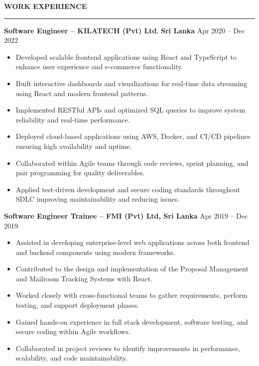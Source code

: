 \documentclass[10pt,letterpaper]{article}
\begin{document}
\textbf{WORK EXPERIENCE}\\[-8pt]
\noindent\rule{\textwidth}{1pt}

\vspace{-2pt}

\textbf{Software Engineer -- KILATECH (Pvt) Ltd}, \textbf{Sri Lanka} \hfill Apr 2020 -- Dec 2022

\vspace{-1pt}

\begin{itemize}
\item Developed scalable frontend applications using React and TypeScript to enhance user experience and e-commerce functionality.
\item Built interactive dashboards and visualizations for real-time data streaming using React and modern frontend patterns.
\item Implemented RESTful APIs and optimized SQL queries to improve system reliability and real-time performance.
\item Deployed cloud-based applications using AWS, Docker, and CI/CD pipelines ensuring high availability and uptime.
\item Collaborated within Agile teams through code reviews, sprint planning, and pair programming for quality deliverables.
\item Applied test-driven development and secure coding standards throughout SDLC improving maintainability and reducing issues.
\end{itemize}

\textbf{Software Engineer Trainee -- FMI (Pvt) Ltd, Sri Lanka} \hfill Apr 2019 -- Dec 2019

\vspace{-1pt}

\begin{itemize}
\item Assisted in developing enterprise-level web applications across both frontend and backend components using modern frameworks.
\item Contributed to the design and implementation of the Proposal Management and Mailroom Tracking Systems with React.
\item Worked closely with cross-functional teams to gather requirements, perform testing, and support deployment phases.
\item Gained hands-on experience in full stack development, software testing, and secure coding within Agile workflows.
\item Collaborated in project reviews to identify improvements in performance, scalability, and code maintainability.
\end{itemize}
\end{document}
